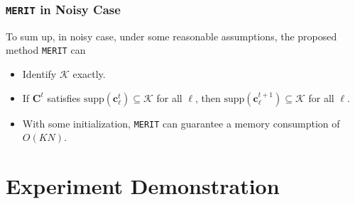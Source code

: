 \documentclass[10pt,xcolor={usenames,dvipsnames,table}]{beamer}
\newcommand\coolover[2]{\mathrlap{\smash{\overbrace{\phantom{%
    \begin{matrix} #2 \end{matrix}}}^{\mbox{$#1$}}}}#2}
\newcommand{\tikzmarkx}[2]{\tikz[overlay,remember picture,
  baseline=(#1.base)] \node (#1) {#2};}
\newcommand{\Highlight}[1][submatrix]{%
    \tikz[overlay,remember picture]{
    \node[highlight,fit=(left.north west) (right.south east)] (#1) {};}
}
\begin{document}
%



\begin{frame}
    \frametitle{\texttt{MERIT} in Noisy Case}
    To sum up, in noisy case, under some reasonable assumptions, the proposed method \texttt{MERIT} can
    \begin{itemize}
        \item Identify $\mathcal{K}$ exactly.
        \item If $\bm{C}^{t}$ satisfies $\text{supp}(\bm{c}_\ell^{t}) \subseteq \mathcal{K}$ for all $\ell$, then $\text{supp}(\bm{c}_\ell^{t+1}) \subseteq \mathcal{K}$ for all $\ell$.
        \item With some initialization, \texttt{MERIT} can guarantee a memory consumption of $O(KN)$.
    \end{itemize}
\end{frame}



\section{Experiment Demonstration}%
\label{sec:real_demonstration}
\end{document}
